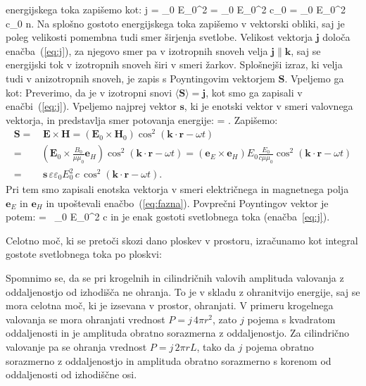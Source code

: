 energijskega toka zapišemo kot:
\beq
j = \varepsilon \varepsilon_0 E_0^2  = 
\sqrt{\varepsilon} \varepsilon_0 E_0^2 c_0 =  \varepsilon_0 E_0^2 c_0 n.
\label{eq:03_33}
\eeq
Na splošno gostoto energijskega toka zapišemo v vektorski obliki, saj je poleg velikosti
pomembna tudi smer širjenja svetlobe. Velikost vektorja $\mathbf{j}$ določa 
enačba~(\ref{eq:j}), za njegovo smer pa v izotropnih snoveh velja $\mathbf{j}\parallel \mathbf{k}$,
saj se energijski tok v izotropnih snoveh širi v smeri žarkov. 
Splošnejši izraz, ki velja tudi v anizotropnih snoveh, je
zapis s Poyntingovim vektorjem $\mathbf{S}$. Vpeljemo ga kot:
Preverimo, da je v izotropni snovi $\langle\mathbf{S}\rangle = \mathbf{j}$, kot smo ga zapisali 
v enačbi~(\ref{eq:j}). Vpeljemo najprej vektor $\mathbf{s}$, ki je enotski vektor
v smeri valovnega vektorja, in predstavlja smer potovanja energije:
\beq
{} = .
\label{eq:03_34}
\eeq
Zapišemo:
\begin{align}
\mathbf{S}= &\, \mathbf{E}\times \mathbf{H} = \left( \mathbf{E}_0\times \mathbf{H}_0 \right)
\cos^2 \left(\mathbf{k}\cdot \mathbf{r} - \omega t\right) \\
= & \left( \mathbf{E}_0 \times \frac{B_0}{\mu\mu_0}\mathbf{e}_H \right) 
\cos^2 \left(\mathbf{k}\cdot \mathbf{r} - \omega t\right) = 
\left(\mathbf{e}_E \times \mathbf{e}_H \right)E_0\frac{E_0}{c\mu\mu_0} 
\cos^2 \left(\mathbf{k}\cdot \mathbf{r} - \omega t\right)\\
= &\, \mathbf{s}\, \varepsilon \varepsilon_0 E_0^2\,c\, \cos^2 \left(\mathbf{k}\cdot \mathbf{r} - \omega t\right)\!.
\label{eq:03_35}
\end{align}
Pri tem smo zapisali enotska vektorja v smeri električnega in magnetnega polja 
$\mathbf{e}_E$ in $\mathbf{e}_H$ in upoštevali enačbo~(\ref{eq:fazna}). 
Povprečni Poyntingov vektor je potem:
\beq
\langle{}\rangle =  
\, \varepsilon \varepsilon_0 E_0^2 c
\label{eq:03_36}
\eeq
in je enak gostoti svetlobnega toka (enačba~\ref{eq:j}).

Celotno moč, ki se pretoči skozi dano ploskev v prostoru, izračunamo kot 
integral gostote svetlobnega toka po ploskvi:

\begin{remark}
Spomnimo se, da se pri krogelnih in cilindričnih valovih amplituda valovanja
z oddaljenostjo od izhodišča ne ohranja. To je v skladu z ohranitvijo energije, saj 
se mora celotna moč, ki je izsevana v prostor, ohranjati. V primeru krogelnega
valovanja se mora ohranjati vrednost $P = j\,4 \pi r^2$, zato $j$ pojema s kvadratom
oddaljenosti in je amplituda obratno sorazmerna z oddaljenostjo. Za cilindrično
valovanje pa se ohranja vrednost $P = j\,2\pi r L$, tako da $j$ pojema obratno
sorazmerno z oddaljenostjo in amplituda obratno sorazmerno s korenom od oddaljenosti
od izhodiščne osi. 
\end{remark}

